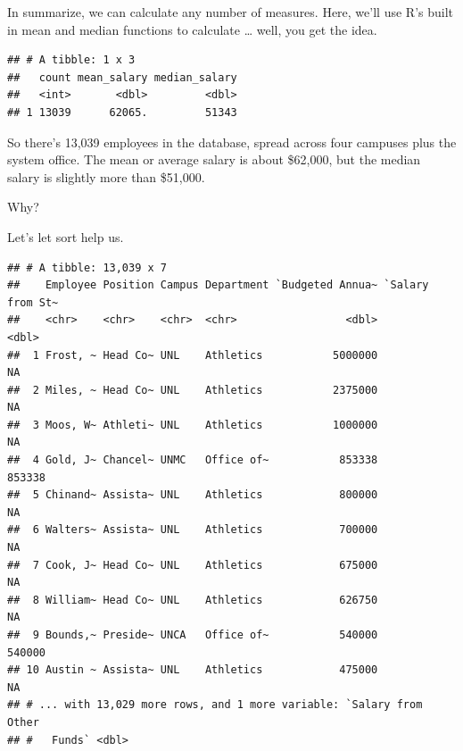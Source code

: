 \documentclass[]{book}
\newenvironment{Shaded}{\begin{snugshade}}{\end{snugshade}}
\newcommand{\KeywordTok}[1]{\textcolor[rgb]{0.13,0.29,0.53}{\textbf{#1}}}
\newcommand{\DataTypeTok}[1]{\textcolor[rgb]{0.13,0.29,0.53}{#1}}
\newcommand{\StringTok}[1]{\textcolor[rgb]{0.31,0.60,0.02}{#1}}
\newcommand{\OperatorTok}[1]{\textcolor[rgb]{0.81,0.36,0.00}{\textbf{#1}}}
\newcommand{\NormalTok}[1]{#1}
\begin{document}
In summarize, we can calculate any number of measures. Here, we'll use
R's built in mean and median functions to calculate \ldots{} well, you
get the idea.

\begin{Shaded}
\end{Shaded}

\begin{verbatim}
## # A tibble: 1 x 3
##   count mean_salary median_salary
##   <int>       <dbl>         <dbl>
## 1 13039      62065.         51343
\end{verbatim}

So there's 13,039 employees in the database, spread across four campuses
plus the system office. The mean or average salary is about \$62,000,
but the median salary is slightly more than \$51,000.

Why?

Let's let sort help us.

\begin{Shaded}
\end{Shaded}

\begin{verbatim}
## # A tibble: 13,039 x 7
##    Employee Position Campus Department `Budgeted Annua~ `Salary from St~
##    <chr>    <chr>    <chr>  <chr>                 <dbl>            <dbl>
##  1 Frost, ~ Head Co~ UNL    Athletics           5000000               NA
##  2 Miles, ~ Head Co~ UNL    Athletics           2375000               NA
##  3 Moos, W~ Athleti~ UNL    Athletics           1000000               NA
##  4 Gold, J~ Chancel~ UNMC   Office of~           853338           853338
##  5 Chinand~ Assista~ UNL    Athletics            800000               NA
##  6 Walters~ Assista~ UNL    Athletics            700000               NA
##  7 Cook, J~ Head Co~ UNL    Athletics            675000               NA
##  8 William~ Head Co~ UNL    Athletics            626750               NA
##  9 Bounds,~ Preside~ UNCA   Office of~           540000           540000
## 10 Austin ~ Assista~ UNL    Athletics            475000               NA
## # ... with 13,029 more rows, and 1 more variable: `Salary from Other
## #   Funds` <dbl>
\end{verbatim}
\end{document}
